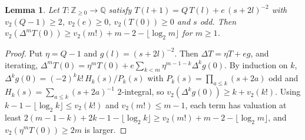 \documentclass[11pt]{amsart}
\newtheorem{lemma}[theorem]{Lemma}
\theoremstyle{definition}
\theoremstyle{remark}
\numberwithin{equation}{section}
\newcommand{\ZZ}{\mathbb{Z}}
\newcommand{\QQ}{\mathbb{Q}}
\begin{document}
\begin{lemma}\label{lem:fdseq}
Let $T\colon\ZZ_{\ge0}\to\QQ$ satisfy $T(l+1)=Q\,T(l)+e\,(s+2l)^{-2}$ with $v_2(Q-1)\ge2$, $v_2(e)\ge0$, $v_2(T(0))\ge0$
and $s$ odd. Then $v_2(\Delta^mT(0))\ge v_2(m!)+m-2-\lfloor\log_2m\rfloor$ for $m\ge1$.
\end{lemma}

\begin{proof}
Put $\eta=Q-1$ and $g(l)=(s+2l)^{-2}$. Then $\Delta T=\eta T+eg$, and iterating,
$\Delta^mT(0)=\eta^mT(0)+e\sum_{k<m}\eta^{m-1-k}\Delta^kg(0)$. By induction on $k$,
$\Delta^kg(0)=(-2)^kk!\,H_k(s)/P_k(s)$ with $P_k(s)=\prod_{a\le k}(s+2a)$ odd and $H_k(s)=\sum_{a\le k}(s+2a)^{-1}$
$2$-integral, so $v_2(\Delta^kg(0))\ge k+v_2(k!)$. Using $k-1-\lfloor\log_2k\rfloor\le v_2(k!)$ and $v_2(m!)\le m-1$, each
term has valuation at least $2(m-1-k)+2k-1-\lfloor\log_2k\rfloor\ge v_2(m!)+m-2-\lfloor\log_2m\rfloor$, and
$v_2(\eta^mT(0))\ge2m$ is larger.
\end{proof}
\end{document}
